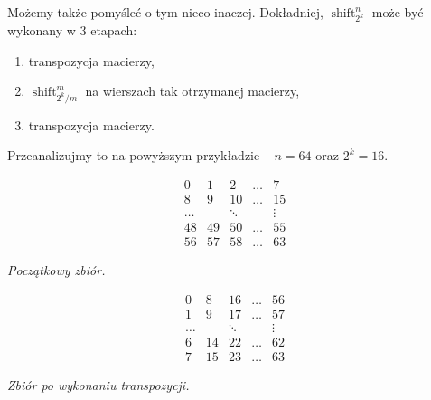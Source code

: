 \documentclass[a4paper]{article}
\newcommand{\shift}[2]{\operatorname{shift}_{#2}^{#1}}
\theoremstyle{definition}
\begin{document}
\vspace{1em}

Możemy także pomyśleć o tym nieco inaczej. Dokładniej, \(\shift n {2^k}\) może być wykonany w 3 etapach:

\begin{enumerate}
    \item transpozycja macierzy,
    \item \(\shift {m} {2^k/m}\) na wierszach tak otrzymanej macierzy,
    \item transpozycja macierzy.
\end{enumerate}

Przeanalizujmy to na powyższym przykładzie -- \(n = 64\) oraz \(2^k = 16\).

\vspace{0.5em}

\begin{minipage}{.5\textwidth} %

\[
\begin{matrix}
 0 &  1 &  2 &  \ldots & 7 \\
 8 &  9 & 10 &  \ldots & 15 \\
\ldots & & \ddots &  & \vdots \\
48 & 49 & 50 & \ldots & 55 \\
56 & 57 & 58 & \ldots & 63 
\end{matrix}
\]

\begin{center} \it
    Początkowy zbiór.
\end{center}

\end{minipage} %
\begin{minipage}{.5\textwidth} %

\[
\begin{matrix}
 0 &  8 &  16 &  \ldots & 56 \\
 1 &  9 &  17 &  \ldots & 57 \\
\ldots  & & \ddots &     & \vdots \\
 6 & 14 & 22 & \ldots   & 62 \\
 7 & 15 & 23 & \ldots   & 63 
\end{matrix}
\]

\begin{center} \it
    Zbiór po wykonaniu transpozycji.
\end{center}
\end{minipage}

\vspace{0.5em}
\end{document}
